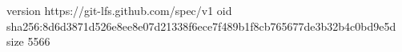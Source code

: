 version https://git-lfs.github.com/spec/v1
oid sha256:8d6d3871d526e8ee8e07d21338f6ece7f489b1f8cb765677de3b32b4c0bd9e5d
size 5566
